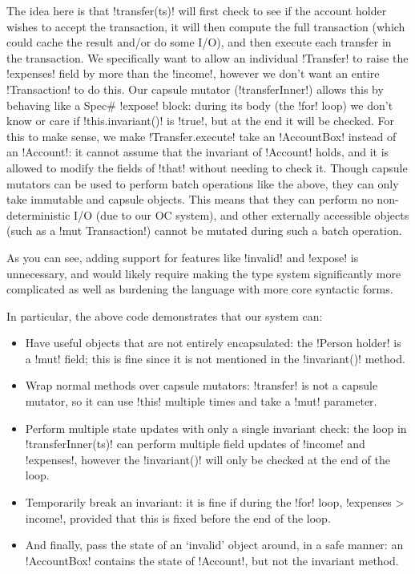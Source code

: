 The idea here is that \Q!transfer(ts)! will first check to see if the account holder wishes to accept the transaction, it will then compute the full transaction (which could cache the result and/or do some I/O), and then execute each transfer in the transaction. We specifically want to allow an individual \Q!Transfer! to raise the \Q!expenses! field by more than the \Q!income!, however we don't want an entire \Q!Transaction! to do this. 
Our capsule mutator (\Q!transferInner!) allows this by behaving like a Spec\# \Q!expose! block: during its body (the \Q!for! loop) we don't know or care if \Q!this.invariant()! is \Q!true!, but at the end it will be checked. For this to make sense, we make \Q!Transfer.execute! take an \Q!AccountBox! instead of an \Q!Account!: it cannot assume that the invariant of \Q!Account! holds, and it is allowed to modify the fields of \Q!that! without needing to check it. Though capsule mutators can be used to perform batch operations like the above, they can only take immutable and capsule objects. This means that they can perform no non-deterministic I/O (due to our OC system), and other externally accessible objects (such as a \Q!mut Transaction!) cannot be mutated during such a batch operation.

As you can see, adding support for features like \Q!invalid! and \Q!expose! is unnecessary, and would likely require making the type system significantly more complicated as well as burdening the language with more core syntactic forms.

In particular, the above code demonstrates that our system can:
\SSI\begin{itemize}
\item Have useful objects that are not entirely encapsulated: the \Q!Person holder! is a \Q!mut! field; this is fine since it is not mentioned in the \Q!invariant()! method.
\item Wrap normal methods over capsule mutators: \Q!transfer! is not a capsule mutator, so it can use \Q!this! multiple times and take a \Q!mut! parameter.
\item Perform multiple state updates with only a single invariant check: the loop in \Q!transferInner(ts)! can perform multiple field updates of \Q!income! and \Q!expenses!, however the \Q!invariant()! will only be checked at the end of the loop.
\item Temporarily break an invariant: it is fine if during the \Q!for! loop, \Q!expenses > income!, provided that this is fixed before the end of the loop.
\item And finally, pass the state of an `invalid' object around, in a safe manner: an \Q!AccountBox! contains the state of \Q!Account!, but not the invariant method.
\end{itemize}


